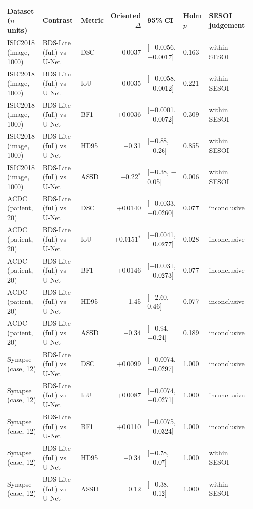 \begin{tabular}{lllrlll}
\toprule
Dataset ($n$ units) & Contrast & Metric & Oriented $\Delta$ & 95\% CI & Holm $p$ & SESOI judgement \\
\midrule
ISIC2018 (image, 1000) & BDS-Lite (full) vs U-Net & DSC & $-$0.0037 & [$-$0.0056, $-$0.0017] & 0.163 & within SESOI \\
ISIC2018 (image, 1000) & BDS-Lite (full) vs U-Net & IoU & $-$0.0035 & [$-$0.0058, $-$0.0012] & 0.221 & within SESOI \\
ISIC2018 (image, 1000) & BDS-Lite (full) vs U-Net & BF1 & +0.0036 & [+0.0001, +0.0072] & 0.309 & within SESOI \\
ISIC2018 (image, 1000) & BDS-Lite (full) vs U-Net & HD95 & $-$0.31 & [$-$0.88, +0.26] & 0.855 & within SESOI \\
ISIC2018 (image, 1000) & BDS-Lite (full) vs U-Net & ASSD & $-$0.22$^{*}$ & [$-$0.38, $-$0.05] & 0.006 & within SESOI \\
\midrule
ACDC (patient, 20) & BDS-Lite (full) vs U-Net & DSC & +0.0140 & [+0.0033, +0.0260] & 0.077 & inconclusive \\
ACDC (patient, 20) & BDS-Lite (full) vs U-Net & IoU & +0.0151$^{*}$ & [+0.0041, +0.0277] & 0.028 & inconclusive \\
ACDC (patient, 20) & BDS-Lite (full) vs U-Net & BF1 & +0.0146 & [+0.0031, +0.0273] & 0.077 & inconclusive \\
ACDC (patient, 20) & BDS-Lite (full) vs U-Net & HD95 & $-$1.45 & [$-$2.60, $-$0.46] & 0.077 & inconclusive \\
ACDC (patient, 20) & BDS-Lite (full) vs U-Net & ASSD & $-$0.34 & [$-$0.94, +0.24] & 0.189 & inconclusive \\
\midrule
Synapse (case, 12) & BDS-Lite (full) vs U-Net & DSC & +0.0099 & [$-$0.0074, +0.0297] & 1.000 & inconclusive \\
Synapse (case, 12) & BDS-Lite (full) vs U-Net & IoU & +0.0087 & [$-$0.0074, +0.0271] & 1.000 & inconclusive \\
Synapse (case, 12) & BDS-Lite (full) vs U-Net & BF1 & +0.0110 & [$-$0.0075, +0.0324] & 1.000 & inconclusive \\
Synapse (case, 12) & BDS-Lite (full) vs U-Net & HD95 & $-$0.34 & [$-$0.78, +0.07] & 1.000 & within SESOI \\
Synapse (case, 12) & BDS-Lite (full) vs U-Net & ASSD & $-$0.12 & [$-$0.38, +0.12] & 1.000 & within SESOI \\
\bottomrule
\end{tabular}

